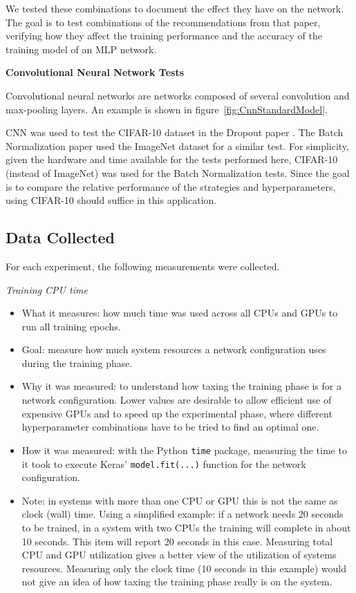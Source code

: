 \documentclass[../CAP6619_term_project_cgarbin.tex]{subfiles}
\begin{document}
We tested these combinations to document the effect they have on the network. The goal is to test combinations of the recommendations from that paper, verifying how they affect the training performance and the accuracy of the training model of an MLP network.

\medskip
\textbf{Convolutional Neural Network Tests}

Convolutional neural networks are networks composed of several convolution and max-pooling layers. An example is shown in figure~\ref{fig:CnnStandardModel}.

CNN was used to test the CIFAR-10 dataset in the Dropout paper \cite{Srivastava2014}. The Batch Normalization paper \cite{Ioffe2015} used the ImageNet dataset for a similar test. For simplicity, given the hardware and time available for the tests performed here, CIFAR-10 (instead of ImageNet) was used for the Batch Normalization tests. Since the goal is to compare the relative performance of the strategies and hyperparameters, using CIFAR-10 should suffice in this application.

\subsection{Data Collected}

For each experiment, the following measurements were collected.

\smallskip
\textit{Training CPU time}
\begin{itemize}
\item What it measures: how much time was used across all CPUs and GPUs to run all training epochs.
\item Goal: measure how much system resources a network configuration uses during the training phase. 
\item Why it was measured: to understand how taxing the training phase is for a network configuration. Lower values are desirable to allow efficient use of expensive GPUs and to speed up the experimental phase, where different hyperparameter combinations have to be tried to find an optimal one.
\item How it was measured: with the Python \verb|time| package, measuring the time to it took to execute Keras' \verb|model.fit(...)| function for the network configuration.
\item Note: in systems with more than one CPU or GPU this is not the same as clock (wall) time. Using a simplified example: if a network needs 20 seconds to be trained, in a system with two CPUs the training will complete in about 10 seconds. This item will report 20 seconds in this case. Measuring total CPU and GPU utilization gives a better view of the utilization of systems resources. Measuring only the clock time (10 seconds in this example) would not give an idea of how taxing the training phase really is on the system.
\end{itemize}
\end{document}

